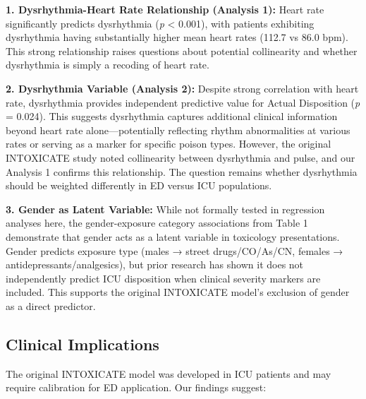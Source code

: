 \documentclass[
]{article}
\begin{document}
\textbf{1. Dysrhythmia-Heart Rate Relationship (Analysis 1):} Heart rate significantly predicts dysrhythmia (\emph{p} \textless{} 0.001), with patients exhibiting dysrhythmia having substantially higher mean heart rates (112.7 vs 86.0 bpm). This strong relationship raises questions about potential collinearity and whether dysrhythmia is simply a recoding of heart rate.

\textbf{2. Dysrhythmia Variable (Analysis 2):} Despite strong correlation with heart rate, dysrhythmia provides independent predictive value for Actual Disposition (\emph{p} = 0.024). This suggests dysrhythmia captures additional clinical information beyond heart rate alone---potentially reflecting rhythm abnormalities at various rates or serving as a marker for specific poison types. However, the original INTOXICATE study noted collinearity between dysrhythmia and pulse, and our Analysis 1 confirms this relationship. The question remains whether dysrhythmia should be weighted differently in ED versus ICU populations.

\textbf{3. Gender as Latent Variable:} While not formally tested in regression analyses here, the gender-exposure category associations from Table 1 demonstrate that gender acts as a latent variable in toxicology presentations. Gender predicts exposure type (males → street drugs/CO/As/CN, females → antidepressants/analgesics), but prior research has shown it does not independently predict ICU disposition when clinical severity markers are included. This supports the original INTOXICATE model's exclusion of gender as a direct predictor.

\subsection{Clinical Implications}\label{clinical-implications}

The original INTOXICATE model was developed in ICU patients and may require calibration for ED application. Our findings suggest:
\end{document}
